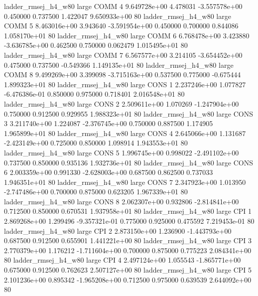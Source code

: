 ladder_rmsej_h4_w80      large     COMM                 4 9.649728e+00      4.478031 -3.557578e+00 0.450000 0.737500       1.422047 9.650933e+00 80
ladder_rmsej_h4_w80      large     COMM                 5 8.463016e+00      3.943640 -3.591954e+00 0.450000 0.700000       0.844086 1.058170e+01 80
ladder_rmsej_h4_w80      large     COMM                 6 6.768478e+00      3.423880 -3.636785e+00 0.462500 0.750000       0.062479 1.015495e+01 80
ladder_rmsej_h4_w80      large     COMM                 7 6.567577e+00      3.214105 -3.654452e+00 0.475000 0.737500      -0.549366 1.149135e+01 80
ladder_rmsej_h4_w80      large     COMM                 8 9.499269e+00      3.399098 -3.715163e+00 0.537500 0.775000      -0.675444 1.899323e+01 80
ladder_rmsej_h4_w80      large     CONS                 1 2.237246e+00      1.077827 -6.476386e-01 0.850000 0.975000       0.718401 2.016548e+01 80
ladder_rmsej_h4_w80      large     CONS                 2 2.509611e+00      1.070269 -1.247904e+00 0.750000 0.912500       0.929955 1.988323e+01 80
ladder_rmsej_h4_w80      large     CONS                 3 3.211740e+00      1.224087 -2.376745e+00 0.750000 0.887500       1.174905 1.965899e+01 80
ladder_rmsej_h4_w80      large     CONS                 4 2.645066e+00      1.131687 -2.423149e+00 0.725000 0.850000       1.098914 1.943553e+01 80
ladder_rmsej_h4_w80      large     CONS                 5 1.996745e+00      0.998022 -2.491102e+00 0.737500 0.850000       0.935136 1.932736e+01 80
ladder_rmsej_h4_w80      large     CONS                 6 2.003359e+00      0.991330 -2.628003e+00 0.687500 0.862500       0.737033 1.946351e+01 80
ladder_rmsej_h4_w80      large     CONS                 7 2.347923e+00      1.013950 -2.747486e+00 0.700000 0.875000       0.623205 1.967339e+01 80
ladder_rmsej_h4_w80      large     CONS                 8 2.062307e+00      0.932806 -2.814841e+00 0.712500 0.850000       0.670531 1.937958e+01 80
ladder_rmsej_h4_w80      large      CPI                 1 2.869268e+00      1.299496 -9.357321e-01 0.775000 0.925000       0.475592 7.219453e-01 80
ladder_rmsej_h4_w80      large      CPI                 2 2.873150e+00      1.236900 -1.443793e+00 0.687500 0.912500       0.655901 1.441221e+00 80
ladder_rmsej_h4_w80      large      CPI                 3 2.770379e+00      1.176212 -1.711604e+00 0.700000 0.875000       0.775223 2.084341e+00 80
ladder_rmsej_h4_w80      large      CPI                 4 2.497124e+00      1.055543 -1.865771e+00 0.675000 0.912500       0.762623 2.507127e+00 80
ladder_rmsej_h4_w80      large      CPI                 5 2.101236e+00      0.895342 -1.965208e+00 0.712500 0.975000       0.639539 2.644092e+00 80
